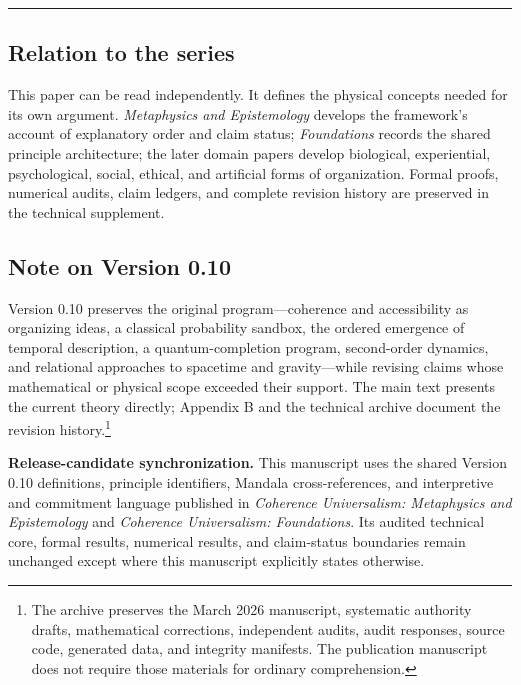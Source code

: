 \documentclass[
  11pt,
]{article}
\begin{document}
\begin{center}\rule{0.5\linewidth}{0.5pt}\end{center}

\subsection{Relation to the series}\label{relation-to-the-series}

This paper can be read independently. It defines the physical concepts
needed for its own argument. \emph{Metaphysics and Epistemology}
develops the framework's account of explanatory order and claim status;
\emph{Foundations} records the shared principle architecture; the later
domain papers develop biological, experiential, psychological, social,
ethical, and artificial forms of organization. Formal proofs, numerical
audits, claim ledgers, and complete revision history are preserved in
the technical supplement.

\subsection{Note on Version 0.10}\label{note-on-version-0.10}

Version 0.10 preserves the original program---coherence and
accessibility as organizing ideas, a classical probability sandbox, the
ordered emergence of temporal description, a quantum-completion program,
second-order dynamics, and relational approaches to spacetime and
gravity---while revising claims whose mathematical or physical scope
exceeded their support. The main text presents the current theory
directly; Appendix B and the technical archive document the revision
history.\footnote{The archive preserves the March 2026 manuscript,
  systematic authority drafts, mathematical corrections, independent
  audits, audit responses, source code, generated data, and integrity
  manifests. The publication manuscript does not require those materials
  for ordinary comprehension.}

\textbf{Release-candidate synchronization.} This manuscript uses the
shared Version 0.10 definitions, principle identifiers, Mandala
cross-references, and interpretive and commitment language published in
\emph{Coherence Universalism: Metaphysics and Epistemology} and
\emph{Coherence Universalism: Foundations}. Its audited technical core,
formal results, numerical results, and claim-status boundaries remain
unchanged except where this manuscript explicitly states otherwise.
\end{document}
